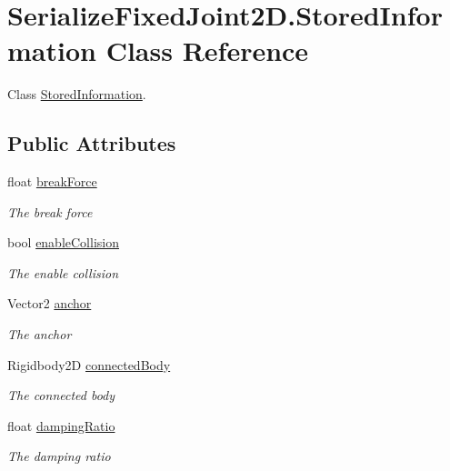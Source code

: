 \hypertarget{class_serialize_fixed_joint2_d_1_1_stored_information}{}\section{Serialize\+Fixed\+Joint2\+D.\+Stored\+Information Class Reference}
\label{class_serialize_fixed_joint2_d_1_1_stored_information}


Class \hyperlink{class_serialize_fixed_joint2_d_1_1_stored_information}{Stored\+Information}.  


\subsection*{Public Attributes}
\begin{DoxyCompactItemize}
\item 
float \hyperlink{class_serialize_fixed_joint2_d_1_1_stored_information_aaed8b358b9dca19c939c8d8ab8f0057a}{break\+Force}
\begin{DoxyCompactList}\small\item\em The break force \end{DoxyCompactList}\item 
bool \hyperlink{class_serialize_fixed_joint2_d_1_1_stored_information_a36d8055ea834af25f36f5a4e0f2d29e2}{enable\+Collision}
\begin{DoxyCompactList}\small\item\em The enable collision \end{DoxyCompactList}\item 
Vector2 \hyperlink{class_serialize_fixed_joint2_d_1_1_stored_information_af97957178a71f91c3f5b04109d727267}{anchor}
\begin{DoxyCompactList}\small\item\em The anchor \end{DoxyCompactList}\item 
Rigidbody2D \hyperlink{class_serialize_fixed_joint2_d_1_1_stored_information_a02db682e774ec885533c6634e332eead}{connected\+Body}
\begin{DoxyCompactList}\small\item\em The connected body \end{DoxyCompactList}\item 
float \hyperlink{class_serialize_fixed_joint2_d_1_1_stored_information_a38dadcba194381edf34f029271c59605}{damping\+Ratio}
\begin{DoxyCompactList}\small\item\em The damping ratio \end{DoxyCompactList}\end{DoxyCompactItemize}


